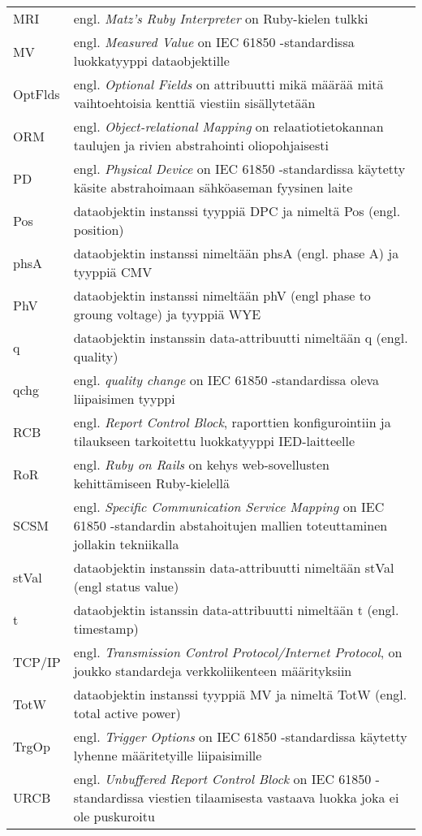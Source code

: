 \begin{tabularx}{\linewidth}[h]{@{} p{} p{} @{}}
	MRI & engl. \emph{Matz’s Ruby Interpreter} on Ruby-kielen tulkki \\
	MV & engl. \emph{Measured Value} on IEC 61850 -standardissa luokkatyyppi dataobjektille \\
	OptFlds & engl. \emph{Optional Fields} on attribuutti mikä määrää mitä vaihtoehtoisia kenttiä viestiin sisällytetään \\
	ORM & engl. \emph{Object-relational Mapping} on relaatiotietokannan taulujen ja rivien abstrahointi oliopohjaisesti \\
	PD & engl. \emph{Physical Device} on IEC 61850 -standardissa käytetty käsite abstrahoimaan sähköaseman fyysinen laite \\
	Pos & dataobjektin instanssi tyyppiä DPC ja nimeltä Pos (engl. position) \\
	phsA & dataobjektin instanssi nimeltään phsA (engl. phase A) ja tyyppiä CMV \\
	PhV & dataobjektin instanssi nimeltään phV (engl phase to groung voltage) ja tyyppiä WYE \\
	q & dataobjektin instanssin data-attribuutti nimeltään q (engl. quality) \\
	qchg & engl. \emph{quality change} on IEC 61850 -standardissa oleva liipaisimen tyyppi \\
	RCB & engl. \emph{Report Control Block}, raporttien konfigurointiin ja tilaukseen tarkoitettu luokkatyyppi IED-laitteelle \\
	RoR & engl. \emph{Ruby on Rails} on kehys web-sovellusten kehittämiseen Ruby-kielellä \\
	SCSM & engl. \emph{Specific Communication Service Mapping} on IEC 61850 -standardin abstahoitujen mallien toteuttaminen jollakin tekniikalla \\
	stVal & dataobjektin instanssin data-attribuutti nimeltään stVal (engl status value) \\
	t & dataobjektin istanssin data-attribuutti nimeltään t (engl. timestamp) \\
	TCP/IP & engl. \emph{Transmission Control Protocol/Internet Protocol}, on joukko standardeja verkkoliikenteen määrityksiin \\
	TotW & dataobjektin instanssi tyyppiä MV ja nimeltä TotW (engl. total active power) \\
	TrgOp & engl. \emph{Trigger Options} on IEC 61850 -standardissa käytetty lyhenne määritetyille liipaisimille \\
	URCB & engl. \emph{Unbuffered Report Control Block} on IEC 61850 -standardissa viestien tilaamisesta vastaava luokka joka ei ole puskuroitu \\

\end{tabularx}

